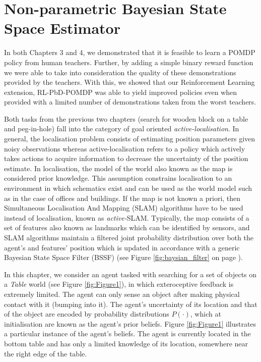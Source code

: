 \chapter{Non-parametric Bayesian State Space Estimator}

In both Chapters 3 and 4, we demonstrated that it is feasible to learn a POMDP policy from human teachers. Further,
by adding a simple binary reward function we were able to take into consideration the quality of these demonstrations 
provided by the teachers. With this, we showed that our Reinforcement Learning extension, RL-PbD-POMDP was able to 
yield improved policies even when provided with a limited number of demonstrations taken from the worst teachers.

Both tasks from the previous two chapters (search for wooden block on a table and peg-in-hole) fall into 
the category of goal oriented \textit{active-localisation}. In general, the localisation problem consists of estimating 
position parameters given noisy observations whereas active-localisation refers to a policy which actively takes actions to 
acquire information to decrease the uncertainty of the position estimate. In localisation, the model 
of the world also known as the map is considered prior knowledge. This assumption constrains localisation 
to an environment in which schematics exist and can be used 
as the world model such as in the case of offices and buildings. If the map is not known a priori, then Simultaneous Localisation And Mapping (SLAM) 
algorithms have to be used instead of localisation, known as \textit{active-}SLAM. Typically, the map consists of a set of features also known as landmarks which can be identified by sensors, 
and SLAM algorithms maintain a filtered joint probability distribution over both the agent's and features' position which is updated in accordance with a generic 
Bayesian State Space Filter (BSSF) (see Figure \ref{fig:baysian_filter} on page \pageref{fig:baysian_filter}).

In this chapter, we consider an agent tasked with searching for a set of objects on a \textit{Table} world (see Figure \ref{fig:Figure1}), 
in which exteroceptive feedback is extremely limited. The agent can only sense an object after making physical 
contact with it (bumping into it). The agent's uncertainty of its location and that of the object are encoded by probability distributions $P(\cdot)$, which 
at initialisation are known as the agent's prior beliefs. Figure \ref{fig:Figure1} illustrates a particular instance of the agent's beliefs. The agent is currently located in the 
bottom  table and has only a limited knowledge of its location, somewhere near the right edge of the table. 

